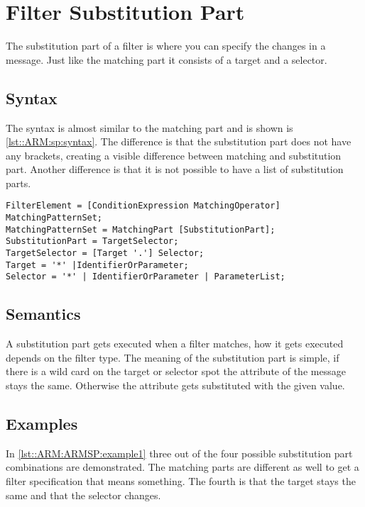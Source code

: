 \chapter{Filter Substitution Part}
The substitution part of a filter is where you can specify the changes in a message. 
Just like the matching part it consists of a target and a selector.

\section{Syntax}
The syntax is almost similar to the matching part and is shown is \autoref{lst::ARM:sp:syntax}. 
The difference is that the substitution part does not have any brackets, creating a visible difference between matching and substitution part. 
Another difference is that it is not possible to have a list of substitution parts.

\begin{lstlisting}[caption={Filter substitution part syntax},label=lst::ARM:sp:syntax,style = listing,language = ebnf,float=tpb]
FilterElement = [ConditionExpression MatchingOperator] MatchingPatternSet;
MatchingPatternSet = MatchingPart [SubstitutionPart];
SubstitutionPart = TargetSelector;
TargetSelector = [Target '.'] Selector;
Target = '*' |IdentifierOrParameter;
Selector = '*' | IdentifierOrParameter | ParameterList;
\end{lstlisting}

\section{Semantics}
A substitution part gets executed when a filter matches, how it gets executed depends on the filter type.
The meaning of the substitution part is simple, if there is a wild card on the target or selector spot the attribute of the message stays the same. 
Otherwise the attribute gets substituted with the given value.

\section{Examples}
In \autoref{lst::ARM:ARMSP:example1} three out of the four possible substitution part combinations are demonstrated. 
The matching parts are different as well to get a filter specification that means something.
The fourth is that the target stays the same and that the selector changes.

